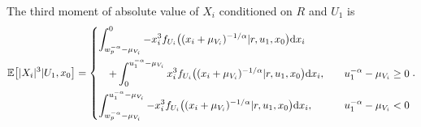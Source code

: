 \documentclass[journal,draftclsnofoot,onecolumn,12pt]{IEEEtran}
\begin{document}
\begin{lemma}\label{lem:rho}
The third moment of absolute value of $X_i$ conditioned on $R$ and $U_1$ is
\begin{align}
{\mathbb{E}} \big[ |X_i|^3 | U_1, x_0 \big] = \begin{dcases}
\int_{w_p^{-\alpha}-\mu_{V_i}}^0 -x_i^3 f_{U_i}\big( (x_i + \mu_{V_i})^{-1/\alpha} | r, u_1, x_0\big) {\rm d}x_i \\
\quad + \int_0^{u_1^{-\alpha} - \mu_{V_i}} x_i^3 f_{U_i}\big( (x_i + \mu_{V_i})^{-1/\alpha} |r,u_1,x_0\big) {\rm d}x_i, \quad &u_1^{-\alpha} - \mu_{V_i} \geq 0 \\
\int_{w_p^{-\alpha}-\mu_{V_i}}^{u_1^{-\alpha} - \mu_{V_i}} -x_i^3 f_{U_i}\big( (x_i + \mu_{V_i})^{-1/\alpha} |r,u_1,x_0\big){\rm d}x_i, &u_1^{-\alpha} - \mu_{V_i} < 0 
\end{dcases}.
\end{align}
\end{lemma}
\end{document}
